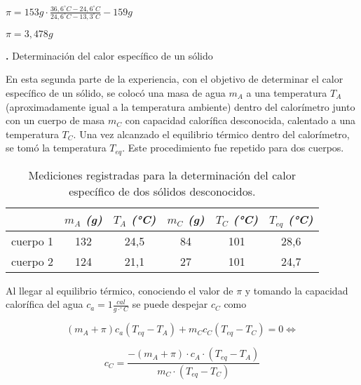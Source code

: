 \documentclass[12pt, a4paper]{article}
\newcounter{step}
\newcommand{\step}[1]
{
  \par\vspace{2ex}
  \stepcounter{step}
  \noindent\textbf{\arabic{step}.} #1\par\vspace{1ex}
}
\begin{document}
\begin{center}
    $ \pi = 153g \cdot \frac{36,6 ^\circ C - 24,6 ^\circ C }{24,6 ^\circ C - 13,3 ^\circ C } - 159g $
\end{center}

\begin{center}
    $ \pi = 3,478 g $
\end{center}


\step{Determinación del calor específico de un sólido}

En esta segunda parte de la experiencia, con el objetivo de determinar el calor específico de un sólido, se colocó una masa de agua $m_A$ a una temperatura $T_A$ (aproximadamente igual a la temperatura ambiente) dentro del calorímetro junto con un cuerpo de masa $m_C$ con capacidad calorífica desconocida, calentado a una temperatura $T_C$. Una vez alcanzado el equilibrio térmico dentro del calorímetro, se tomó la temperatura $T_{eq}$. Este procedimiento fue repetido para dos cuerpos.

\begin{table}[h!]
\centering
    \begin{tabular}{|c|c|c|c|c|c|}
        \hline
            & \textit{$m_A$ (g)} & \textit{$T_A$ (°C)} & \textit{$m_C$ (g)} & \textit{$T_C$ (°C)} & \textit{$T_{eq}$ (°C)} \\
        \hline
            cuerpo 1 & 132 & 24,5 & 84 & 101 & 28,6 \\
        \hline
            cuerpo 2 & 124 & 21,1 & 27 & 101 & 24,7 \\
        \hline
    \end{tabular}
\caption{Mediciones registradas para la determinación del calor específico de dos sólidos desconocidos.}
\end{table}


Al llegar al equilibrio térmico, conociendo el valor de $\pi$ y tomando la capacidad calorífica del agua $c_a =  1 \frac{cal}{g \cdot ^\circ C}$ se puede despejar $c_C$ como

\begin{equation}
    (m_A + \pi) c_a (T_{eq} - T_A) + m_C c_C (T_{eq} - T_C) = 0 \Longleftrightarrow
\end{equation}

\begin{equation}
    c_C = \frac{ - (m_A + \pi) \cdot c_A \cdot (T_{eq} - T_A) }{ m_C \cdot (T_{eq} - T_C) }
\end{equation}
\end{document}
